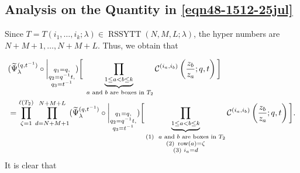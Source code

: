 \documentclass[12pt,reqno,a4paper]{amsart}
\newcommand{\comp}{\circ}
\newcommand{\cals}[1]{\mathcal{#1}}
\numberwithin{equation}{section}
\theoremstyle{definition}
\begin{document}
\subsection{Analysis on the Quantity in 
\eqref{eqn48-1512-25jul}}

Since $T = T(i_1,\dots,i_k;\lambda) \in \operatorname{RSSYTT}(N,M,L;\lambda)$, the hyper numbers are $N+M+1,\dots,N+M+L$. Thus, we obtain that 

\footnotesize
\begin{align}
	&(
	\widetilde{\Psi}_{\lambda}^{(q,t^{-1})}
	\comp 
	\bigg|_{
		\substack{
			q_1 = q, \\
			q_2 = q^{-1}t,\\
			q_3 = t^{-1} \\
		}
	}
	)
	\bigg[
	\underbrace{	\prod_{1 \leq a < b \leq k}				}_{\text{ $a$ and $b$ are boxes in $T_2$}}
	\cals{C}^{(i_a,i_b)}\left(
	\frac{z_b}{z_a}
	; q, t
	\right)
	\bigg]
	\label{eqn312-1501-1aug}
	\\
	&= 
	\prod_{\zeta = 1}^{\ell(T_2)}
	\prod_{d = N+M+1}^{N+M+L}
	(
	\widetilde{\Psi}_{\lambda}^{(q,t^{-1})}
	\comp 
	\bigg|_{
		\substack{
			q_1 = q, \\
			q_2 = q^{-1}t,\\
			q_3 = t^{-1} \\
		}
	}
	)
	\bigg[
	\underbrace{	\prod_{1 \leq a < b \leq k}				}_{
		\substack{
			(1) \,\, \text{ $a$ and $b$ are boxes in $T_2$}
			\\
			(2) \,\, \operatorname{row}(a) = \zeta
			\\
			(3) \,\, i_a = d 
		}	
	}
	\cals{C}^{(i_a,i_b)}\left(
	\frac{z_b}{z_a}
	; q, t
	\right)
	\bigg]. 
	\notag 
\end{align}
\normalsize
It is clear that 
\end{document}
